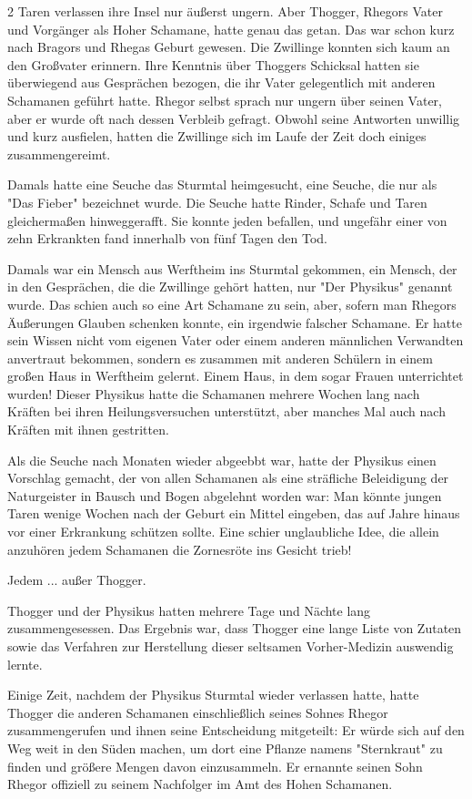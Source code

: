 \documentclass[10pt, a4paper, oneside]{book}
\begin{document}
\begin{multicols}{2}
Taren verlassen ihre Insel nur äußerst ungern. Aber Thogger, Rhegors Vater und Vorgänger als Hoher Schamane, hatte genau das getan. Das war schon kurz nach Bragors und Rhegas Geburt gewesen. Die Zwillinge konnten sich kaum an den Großvater erinnern. Ihre Kenntnis über Thoggers Schicksal hatten sie überwiegend aus Gesprächen bezogen, die ihr Vater gelegentlich mit anderen Schamanen geführt hatte. Rhegor selbst sprach nur ungern über seinen Vater, aber er wurde oft nach dessen Verbleib gefragt. Obwohl seine Antworten unwillig und kurz ausfielen, hatten die Zwillinge sich im Laufe der Zeit doch einiges zusammengereimt. 

Damals hatte eine Seuche das Sturmtal heimgesucht, eine Seuche, die nur als "Das Fieber" bezeichnet wurde. Die Seuche hatte Rinder, Schafe und Taren gleichermaßen hinweggerafft. Sie konnte jeden befallen, und ungefähr einer von zehn Erkrankten fand innerhalb von fünf Tagen den Tod. 

Damals war ein Mensch aus Werftheim ins Sturmtal gekommen, ein Mensch, der in den Gesprächen, die die Zwillinge gehört hatten, nur "Der Physikus" genannt wurde. 
Das schien auch so eine Art Schamane zu sein, aber, sofern man Rhegors Äußerungen Glauben schenken konnte, ein irgendwie falscher Schamane. Er hatte sein Wissen nicht vom eigenen Vater oder einem anderen männlichen Verwandten anvertraut bekommen, sondern es zusammen mit anderen Schülern in einem großen Haus in Werftheim gelernt. Einem Haus, in dem sogar Frauen unterrichtet wurden! 
Dieser Physikus hatte die Schamanen mehrere Wochen lang nach Kräften bei ihren Heilungsversuchen unterstützt, aber manches Mal auch nach Kräften mit ihnen gestritten. 

Als die Seuche nach Monaten wieder abgeebbt war, hatte der Physikus einen Vorschlag gemacht, der von allen Schamanen als eine sträfliche Beleidigung der Naturgeister in Bausch und Bogen abgelehnt worden war: Man könnte jungen Taren wenige Wochen nach der Geburt ein Mittel eingeben, das auf Jahre hinaus vor einer Erkrankung schützen sollte. Eine schier unglaubliche Idee, die allein anzuhören jedem Schamanen die Zornesröte ins Gesicht trieb! 

Jedem ... außer Thogger. 

Thogger und der Physikus hatten mehrere Tage und Nächte lang zusammengesessen. Das Ergebnis war, dass Thogger eine lange Liste von Zutaten sowie das Verfahren zur Herstellung dieser seltsamen Vorher-Medizin auswendig lernte. 

Einige Zeit, nachdem der Physikus Sturmtal wieder verlassen hatte, hatte Thogger die anderen Schamanen einschließlich seines Sohnes Rhegor zusammengerufen und ihnen seine Entscheidung mitgeteilt: Er würde sich auf den Weg weit in den Süden machen, um dort eine Pflanze namens "Sternkraut" zu finden und größere Mengen davon einzusammeln. Er ernannte seinen Sohn Rhegor offiziell zu seinem Nachfolger im Amt des Hohen Schamanen. 


\end{multicols}
\end{document}
